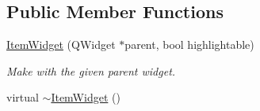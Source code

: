 \subsection*{Public Member Functions}
\begin{DoxyCompactItemize}
\item 
\hyperlink{class_u_i_1_1_item_widget_ac2de5ed6f6e3291ba20105eed50cb1d2}{Item\-Widget} (Q\-Widget $\ast$parent, bool highlightable)
\begin{DoxyCompactList}\small\item\em Make with the given parent widget. \end{DoxyCompactList}\item 
\hypertarget{class_u_i_1_1_item_widget_a0685b1d24977bc519ba81e9640e46dd5}{virtual \hyperlink{class_u_i_1_1_item_widget_a0685b1d24977bc519ba81e9640e46dd5}{$\sim$\-Item\-Widget} ()}\label{class_u_i_1_1_item_widget_a0685b1d24977bc519ba81e9640e46dd5}


\end{DoxyCompactItemize}
